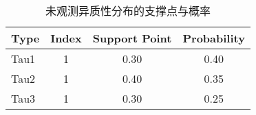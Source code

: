 \begin{table}[htbp]
\centering
\caption{未观测异质性分布的支撑点与概率}
\begin{tabular}{lccc}
\toprule
Type & Index & Support Point & Probability \\
\midrule
Tau1 & 1 & 0.30 & 0.40 \\
Tau2 & 1 & 0.40 & 0.35 \\
Tau3 & 1 & 0.30 & 0.25 \\
\bottomrule
\end{tabular}
\end{table}
